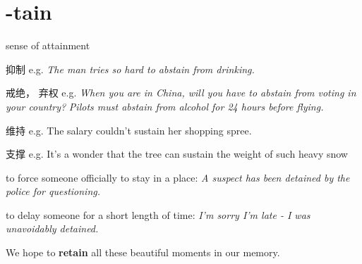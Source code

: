 \chapter{-tain}

\begin{vocabulary}[maintain]
\end{vocabulary}

\begin{vocabulary}[obtain]
\end{vocabulary}

\begin{vocabulary}
    sense of attainment
\end{vocabulary}

\begin{vocabulary}[abstain]
    抑制
    e.g. \textit{The man tries so hard to abstain from drinking.}
    
    戒绝， 弃权
    e.g. \textit{When you are in China, will you have to abstain from voting in your country?}
    \textit{Pilots must abstain from alcohol for 24 hours before flying.}
\end{vocabulary}

\begin{vocabulary}
维持
e.g. The salary couldn't sustain her shopping spree.

支撑
e.g. It's a wonder that the tree can sustain the weight of such heavy snow

\end{vocabulary}

\begin{vocabulary}
to force someone officially to stay in a place:
\textit{A suspect has been detained by the police for questioning.}
 
to delay someone for a short length of time:
\textit{I'm sorry I'm late - I was unavoidably detained.}
\end{vocabulary}

\begin{vocabulary}[retain]
    We hope to \textbf{retain} all these beautiful moments in our memory.
\end{vocabulary}




